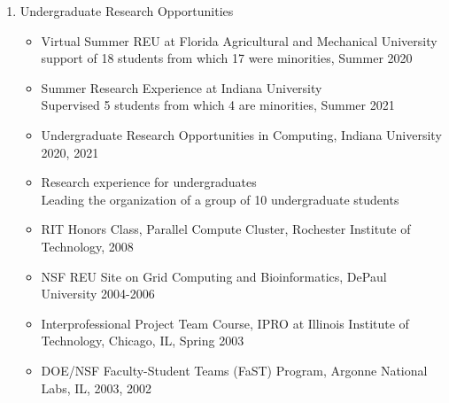 \documentclass{article}
\begin{document}
\begin{enumerate}

\item Undergraduate Research Opportunities
  
  \begin{itemize}
  \item  Virtual Summer REU at Florida Agricultural and Mechanical University~\\
  support of 18 students from which 17 were minorities, Summer 2020
\item  Summer Research Experience at Indiana University ~\\
  Supervised 5 students from which 4 are minorities,  Summer 2021
\item  Undergraduate Research Opportunities in Computing,
  Indiana University 2020, 2021
\item Research experience for undergraduates~\\
  Leading the organization of a group of 10 undergraduate students



    \item RIT Honors Class, Parallel Compute Cluster, Rochester Institute of Technology, 2008
    \item NSF REU Site on Grid Computing and Bioinformatics, DePaul University 2004-2006 
    \item Interprofessional Project Team Course, IPRO at Illinois Institute of Technology, Chicago, IL, Spring 2003
    \item DOE/NSF Faculty-Student Teams (FaST) Program, Argonne National Labs, IL, 2003, 2002 

  \end{itemize}
  

\end{enumerate}
\end{document}
